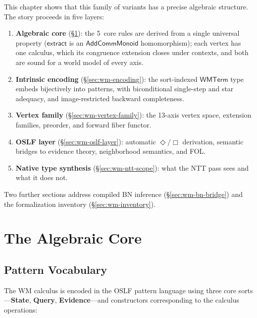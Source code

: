 \documentclass[11pt,openany]{report}
\begin{document}
This chapter shows that this family of variants has a precise algebraic
structure.  The story proceeds in five layers:
\begin{enumerate}
\item \textbf{Algebraic core} (\S\ref{sec:wm-algebraic-core}): the 5~core
  rules are derived from a single universal property ($\mathsf{extract}$ is
  an $\mathsf{AddCommMonoid}$ homomorphism); each vertex has one calculus,
  which its congruence extension closes under contexts, and both are sound
  for a world model of every axis.
\item \textbf{Intrinsic encoding} (\S\ref{sec:wm-encoding}): the
  sort-indexed $\mathsf{WMTerm}$ type embeds bijectively into patterns, with
  biconditional single-step and star adequacy, and image-restricted backward
  completeness.
\item \textbf{Vertex family} (\S\ref{sec:wm-vertex-family}): the 13-axis
  vertex space, extension families, preorder, and forward fiber functor.
\item \textbf{OSLF layer} (\S\ref{sec:wm-oslf-layer}): automatic
  $\Diamond/\Box$ derivation, semantic bridges to evidence theory,
  neighborhood semantics, and FOL.
\item \textbf{Native type synthesis} (\S\ref{sec:wm-ntt-scope}): what the
  NTT pass sees and what it does not.
\end{enumerate}
Two further sections address compiled BN inference
(\S\ref{sec:wm-bn-bridge}) and the formalization inventory
(\S\ref{sec:wm-inventory}).

\section{The Algebraic Core}
\label{sec:wm-algebraic-core}

\subsection{Pattern Vocabulary}

The WM calculus is encoded in the OSLF pattern language using three core
sorts---\textbf{State}, \textbf{Query}, \textbf{Evidence}---and
constructors corresponding to the calculus operations:
\end{document}

